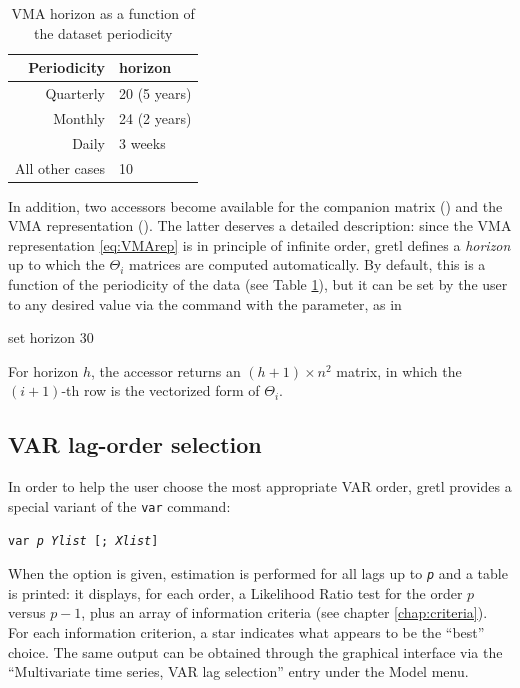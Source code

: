 \begin{table}[htbp]
  \centering
  \begin{tabular}{rl}
    \hline
    Periodicity & horizon \\
    \hline
    Quarterly & 20 (5 years) \\
    Monthly & 24 (2 years) \\
    Daily & 3 weeks \\
    All other cases & 10 \\
    \hline
  \end{tabular}
  \caption{VMA horizon as a function of the dataset periodicity}
  \label{tab:var-horizon}
\end{table}

In addition, two accessors become available for the companion matrix
() and the VMA representation (). The latter
deserves a detailed description: since the VMA representation
\eqref{eq:VMArep} is in principle of infinite order, gretl defines a
\emph{horizon} up to which the $\Theta_i$ matrices are computed
automatically. By default, this is a function of the periodicity of the
data (see Table \ref{tab:var-horizon}), but it can be set by the user to
any desired value via the  command with the 
parameter, as in
\begin{code}
set horizon 30
\end{code}
For horizon $h$, the  accessor returns an $(h+1) \times n^2$
matrix, in which the $(i+1)$-th row is the vectorized form of
$\Theta_i$.

\subsection{VAR lag-order selection}

In order to help the user choose the most appropriate VAR order,
gretl provides a special variant of the \texttt{var} command:
\begin{flushleft}
  \texttt{var \emph{p} \emph{Ylist} [; \emph{Xlist}]} 
\end{flushleft}
When the  option is given, estimation is performed for
all lags up to \texttt{\emph{p}} and a table is printed: it displays,
for each order, a Likelihood Ratio test for the order $p$ versus $p-1$,
plus an array of information criteria (see chapter
\ref{chap:criteria}). For each information criterion, a star indicates
what appears to be the ``best'' choice. The same output can be obtained
through the graphical interface via the ``Multivariate time series, VAR
lag selection'' entry under the \textsf{Model} menu.

